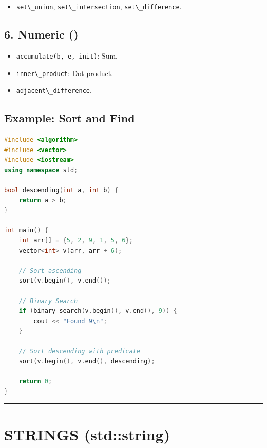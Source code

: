 \begin{itemize}
\tightlist
\item
  \passthrough{\lstinline!set\_union!},
  \passthrough{\lstinline!set\_intersection!},
  \passthrough{\lstinline!set\_difference!}.
\end{itemize}

\hypertarget{numeric}{%
\subsection{6. Numeric ()}\label{numeric}}

\begin{itemize}
\tightlist
\item
  \passthrough{\lstinline!accumulate(b, e, init)!}: Sum.
\item
  \passthrough{\lstinline!inner\_product!}: Dot product.
\item
  \passthrough{\lstinline!adjacent\_difference!}.
\end{itemize}

\hypertarget{example-sort-and-find}{%
\subsection{Example: Sort and Find}\label{example-sort-and-find}}

\begin{lstlisting}[language={C++}]
#include <algorithm>
#include <vector>
#include <iostream>
using namespace std;

bool descending(int a, int b) {
    return a > b;
}

int main() {
    int arr[] = {5, 2, 9, 1, 5, 6};
    vector<int> v(arr, arr + 6);

    // Sort ascending
    sort(v.begin(), v.end());

    // Binary Search
    if (binary_search(v.begin(), v.end(), 9)) {
        cout << "Found 9\n";
    }

    // Sort descending with predicate
    sort(v.begin(), v.end(), descending);

    return 0;
}
\end{lstlisting}

\begin{center}\rule{0.5\linewidth}{0.5pt}\end{center}

\hypertarget{strings-stdstring}{%
\section{STRINGS (std::string)}\label{strings-stdstring}}

